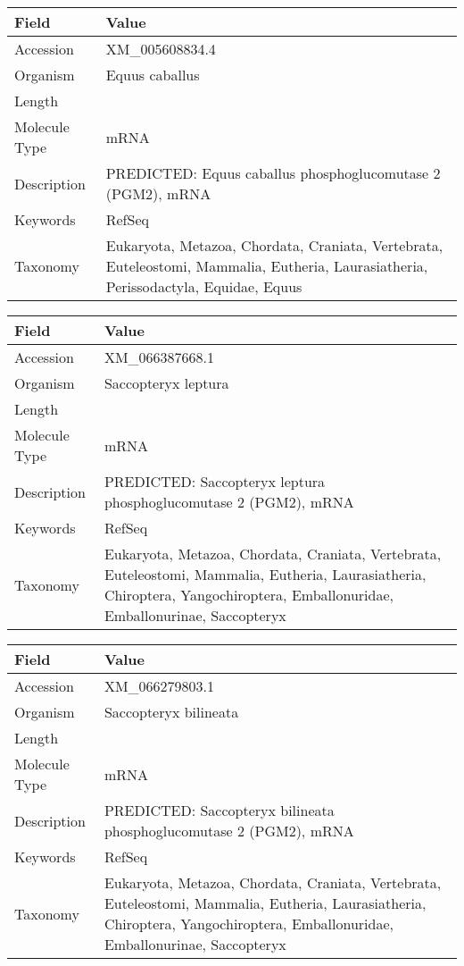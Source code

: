 \documentclass[10pt]{article}
\begin{document}
\vspace{1em}
{\footnotesize
\begin{longtable}{>{\raggedright\arraybackslash}p{4.5cm} >{\raggedright\arraybackslash}p{11.5cm}}
\textbf{Field} & \textbf{Value} \\
\hline
Accession & XM\_005608834.4 \\
Organism & Equus caballus \\
Length & 4403 \\
Molecule Type & mRNA \\
Description & PREDICTED: Equus caballus phosphoglucomutase 2 (PGM2), mRNA \\
Keywords & RefSeq \\
Taxonomy & Eukaryota, Metazoa, Chordata, Craniata, Vertebrata, Euteleostomi, Mammalia, Eutheria, Laurasiatheria, Perissodactyla, Equidae, Equus \\
\end{longtable}
}

\vspace{1em}
{\footnotesize
\begin{longtable}{>{\raggedright\arraybackslash}p{4.5cm} >{\raggedright\arraybackslash}p{11.5cm}}
\textbf{Field} & \textbf{Value} \\
\hline
Accession & XM\_066387668.1 \\
Organism & Saccopteryx leptura \\
Length & 3941 \\
Molecule Type & mRNA \\
Description & PREDICTED: Saccopteryx leptura phosphoglucomutase 2 (PGM2), mRNA \\
Keywords & RefSeq \\
Taxonomy & Eukaryota, Metazoa, Chordata, Craniata, Vertebrata, Euteleostomi, Mammalia, Eutheria, Laurasiatheria, Chiroptera, Yangochiroptera, Emballonuridae, Emballonurinae, Saccopteryx \\
\end{longtable}
}

\vspace{1em}
{\footnotesize
\begin{longtable}{>{\raggedright\arraybackslash}p{4.5cm} >{\raggedright\arraybackslash}p{11.5cm}}
\textbf{Field} & \textbf{Value} \\
\hline
Accession & XM\_066279803.1 \\
Organism & Saccopteryx bilineata \\
Length & 3927 \\
Molecule Type & mRNA \\
Description & PREDICTED: Saccopteryx bilineata phosphoglucomutase 2 (PGM2), mRNA \\
Keywords & RefSeq \\
Taxonomy & Eukaryota, Metazoa, Chordata, Craniata, Vertebrata, Euteleostomi, Mammalia, Eutheria, Laurasiatheria, Chiroptera, Yangochiroptera, Emballonuridae, Emballonurinae, Saccopteryx \\
\end{longtable}
}
\end{document}
